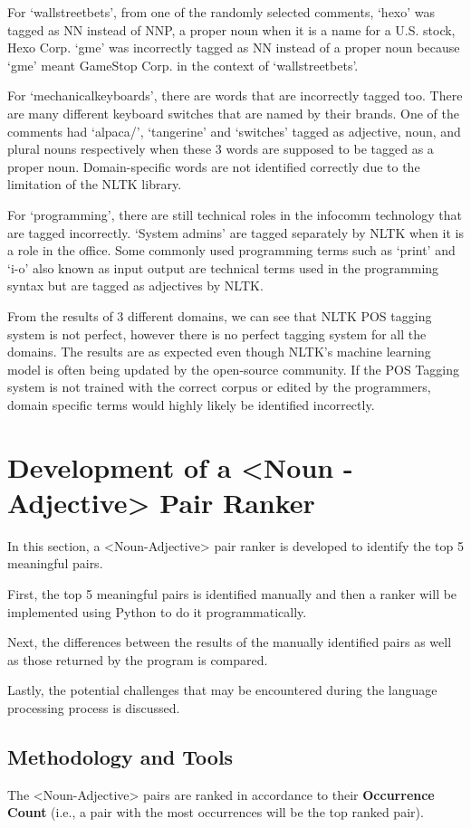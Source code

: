 \documentclass[sigconf,nonacm=true]{acmart}
\begin{document}
For ‘wallstreetbets’, from one of the randomly selected comments, ‘hexo’ was tagged as NN instead of NNP, a proper noun when it is a name for a U.S. stock, Hexo Corp. ‘gme’ was incorrectly tagged as NN instead of a proper noun because ‘gme’ meant GameStop Corp. in the context of ‘wallstreetbets’.

For ‘mechanicalkeyboards’, there are words that are incorrectly tagged too. There are many different keyboard switches that are named by their brands. One of the comments had ‘alpaca/’, ‘tangerine’ and ‘switches’ tagged as adjective, noun, and plural nouns respectively when these 3 words are supposed to be tagged as a proper noun. Domain-specific words are not identified correctly due to the limitation of the NLTK library.

For ‘programming’, there are still technical roles in the infocomm technology that are tagged incorrectly. ‘System admins’ are tagged separately by NLTK when it is a role in the office. Some commonly used programming terms such as ‘print’ and ‘i-o’ also known as input output are technical terms used in the programming syntax but are tagged as adjectives by NLTK.

From the results of 3 different domains, we can see that NLTK POS tagging system is not perfect, however there is no perfect tagging system for all the domains. The results are as expected even though NLTK’s machine learning model is often being updated by the open-source community. If the POS Tagging system is not trained with the correct corpus or edited by the programmers, domain specific terms would highly likely be identified incorrectly.

\section{Development of a <Noun - Adjective> Pair Ranker}
In this section, a <Noun-Adjective> pair ranker is developed to identify the top 5 meaningful pairs. 

First, the top 5 meaningful pairs is identified manually and then a ranker will be implemented using Python to do it programmatically. 

Next, the differences between the results of the manually identified pairs as well as those returned by the program is compared. 

Lastly, the potential challenges that may be encountered during the language processing process is discussed.

\subsection{Methodology and Tools}
The <Noun-Adjective> pairs are ranked in accordance to their \textbf{Occurrence Count} (i.e., a pair with the most occurrences will be the top ranked pair).
\end{document}
